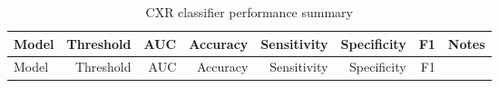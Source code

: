 \begin{longtable}[]{@{}lrrrrrrl@{}}
	\caption{CXR classifier performance summary}\tabularnewline
	\toprule
	\begin{minipage}[b]{0.12\columnwidth}\raggedright
		Model\strut
	\end{minipage}  & \begin{minipage}[b]{0.08\columnwidth}\raggedleft
		Threshold\strut
	\end{minipage} & \begin{minipage}[b]{0.08\columnwidth}\raggedleft
		AUC\strut
	\end{minipage} & \begin{minipage}[b]{0.08\columnwidth}\raggedleft
		Accuracy\strut
	\end{minipage} & \begin{minipage}[b]{0.08\columnwidth}\raggedleft
		Sensitivity\strut
	\end{minipage} & \begin{minipage}[b]{0.08\columnwidth}\raggedleft
		Specificity\strut
	\end{minipage} & \begin{minipage}[b]{0.08\columnwidth}\raggedleft
		F1\strut
	\end{minipage} & \begin{minipage}[b]{0.12\columnwidth}\raggedright
		Notes\strut
	\end{minipage}\tabularnewline
	\midrule
	\endfirsthead
	\toprule
	\begin{minipage}[b]{0.12\columnwidth}\raggedright
		Model\strut
	\end{minipage}  & \begin{minipage}[b]{0.08\columnwidth}\raggedleft
		Threshold\strut
	\end{minipage} & \begin{minipage}[b]{0.08\columnwidth}\raggedleft
		AUC\strut
	\end{minipage} & \begin{minipage}[b]{0.08\columnwidth}\raggedleft
		Accuracy\strut
	\end{minipage} & \begin{minipage}[b]{0.08\columnwidth}\raggedleft
		Sensitivity\strut
	\end{minipage} & \begin{minipage}[b]{0.08\columnwidth}\raggedleft
		Specificity\strut
	\end{minipage} & \begin{minipage}[b]{0.08\columnwidth}\raggedleft
		F1\strut
	\end{minipage} & \begin{minipage}[b]{0.12\columnwidth}\raggedright

\end{minipage}
\end{longtable}
